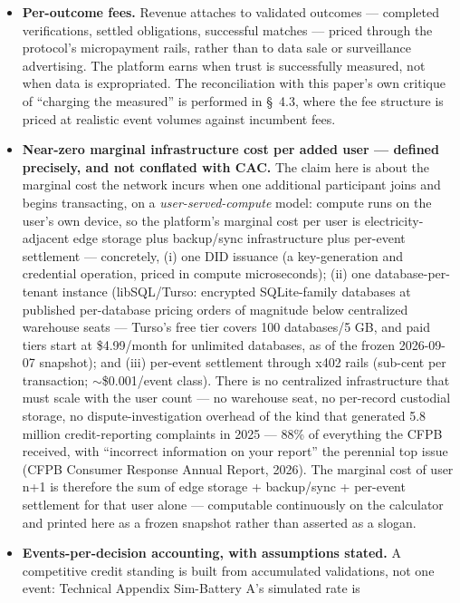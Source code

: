 \documentclass[
]{article}
\begin{document}
\begin{itemize}
\item
  \textbf{Per-outcome fees.} Revenue attaches to validated outcomes ---
  completed verifications, settled obligations, successful matches ---
  priced through the protocol's micropayment rails, rather than to data
  sale or surveillance advertising. The platform earns when trust is
  successfully measured, not when data is expropriated. The
  reconciliation with this paper's own critique of ``charging the
  measured'' is performed in §~4.3, where the fee structure is priced at
  realistic event volumes against incumbent fees.
\item
  \textbf{Near-zero marginal infrastructure cost per added user ---
  defined precisely, and not conflated with CAC.} The claim here is
  about the marginal cost the network incurs when one additional
  participant joins and begins transacting, on a
  \emph{user-served-compute} model: compute runs on the user's own
  device, so the platform's marginal cost per user is
  electricity-adjacent edge storage plus backup/sync infrastructure plus
  per-event settlement --- concretely, (i) one DID issuance (a
  key-generation and credential operation, priced in compute
  microseconds); (ii) one database-per-tenant instance (libSQL/Turso:
  encrypted SQLite-family databases at published per-database pricing
  orders of magnitude below centralized warehouse seats --- Turso's free
  tier covers 100 databases/5 GB, and paid tiers start at \$4.99/month
  for unlimited databases, as of the frozen 2026-09-07 snapshot); and
  (iii) per-event settlement through x402 rails (sub-cent per
  transaction; \(\sim\)\$0.001/event class). There is no centralized
  infrastructure that must scale with the user count --- no warehouse
  seat, no per-record custodial storage, no dispute-investigation
  overhead of the kind that generated 5.8 million credit-reporting
  complaints in 2025 --- 88\% of everything the CFPB received, with
  ``incorrect information on your report'' the perennial top issue (CFPB
  Consumer Response Annual Report, 2026). The marginal cost of user n+1
  is therefore the sum of edge storage + backup/sync + per-event
  settlement for that user alone --- computable continuously on the
  calculator and printed here as a frozen snapshot rather than asserted
  as a slogan.
\item
  \textbf{Events-per-decision accounting, with assumptions stated.} A
  competitive credit standing is built from accumulated validations, not
  one event: Technical Appendix Sim-Battery A's simulated rate is

\end{itemize}
\end{document}
